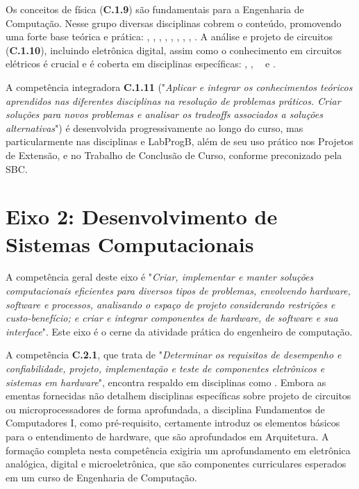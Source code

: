 Os conceitos de física (\textbf{C.1.9}) são fundamentais para a Engenharia de Computação. Nesse grupo diversas disciplinas cobrem o conteúdo, promovendo uma forte base teórica e prática: \textbf{\FisI}, \textbf{\FisEI}, \textbf{\FisII}, \textbf{\FisEII}, \textbf{\FisIII}, \textbf{\FisEIII}, \textbf{\FisIV}, \textbf{\FisEIV}, \textbf{\MatEle}. A análise e projeto de circuitos (\textbf{C.1.10}), incluindo eletrônica digital, assim como o conhecimento em circuitos elétricos é crucial e é coberta em disciplinas específicas: \textbf{\CircEle}, \textbf{\TecDig}, \textbf{\CCC~} e \textbf{\CCA}.

A competência integradora \textbf{C.1.11} ("\textit{Aplicar e integrar os conhecimentos teóricos aprendidos nas diferentes disciplinas na resolução de problemas práticos. Criar soluções para novos problemas e analisar os tradeoffs associados a soluções alternativas}") é desenvolvida progressivamente ao longo do curso, mas particularmente nas disciplinas \LabProgA e LabProgB, além de seu uso prático nos Projetos de Extensão, \EstSup e no Trabalho de Conclusão de Curso, conforme preconizado pela SBC.

\section{Eixo 2: Desenvolvimento de Sistemas Computacionais}
A competência geral deste eixo é "\textit{Criar, implementar e manter soluções computacionais eficientes para diversos tipos de problemas, envolvendo hardware, software e processos, analisando o espaço de projeto considerando restrições e custo-benefício; e criar e integrar componentes de hardware, de software e sua interface}". Este eixo é o cerne da atividade prática do engenheiro de computação.

A competência \textbf{C.2.1}, que trata de "\textit{Determinar os requisitos de desempenho e confiabilidade, projeto, implementação e teste de componentes eletrônicos e sistemas em hardware}", encontra respaldo em disciplinas como \textbf{\ArqComp}. Embora as ementas fornecidas não detalhem disciplinas específicas sobre projeto de circuitos ou microprocessadores de forma aprofundada, a disciplina Fundamentos de Computadores I, como pré-requisito, certamente introduz os elementos básicos para o entendimento de hardware, que são aprofundados em Arquitetura. A formação completa nesta competência exigiria um aprofundamento em eletrônica analógica, digital e microeletrônica, que são componentes curriculares esperados em um curso de Engenharia de Computação.

